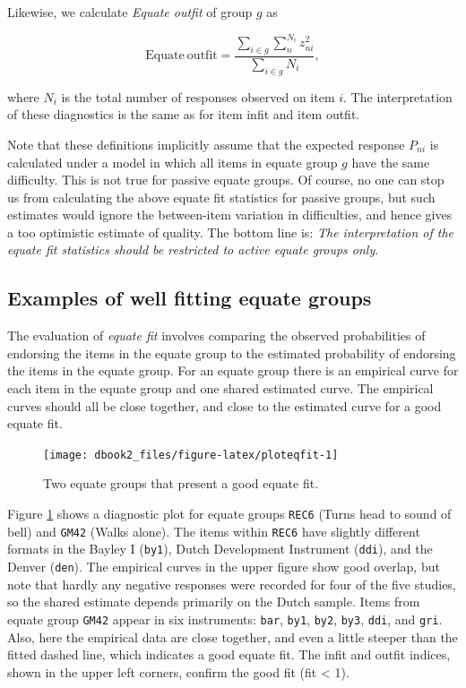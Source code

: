 \documentclass[
]{book}
\begin{document}
Likewise, we calculate \emph{Equate outfit} of group \(g\) as

\[\mathrm{Equate\ outfit} = \frac{\sum_{i\in g}\sum_{n}^{N_i} z_{ni}^2}{\sum_{i\in g} N_i},\]

where \(N_i\) is the total number of responses observed on item \(i\). The interpretation of these diagnostics is the same as for item infit and item outfit.

Note that these definitions implicitly assume that the expected response \(P_{ni}\) is calculated under a model in which all items in equate group \(g\) have the same difficulty. This is not true for passive equate groups. Of course, no one can stop us from calculating the above equate fit statistics for passive groups, but such estimates would ignore the between-item variation in difficulties, and hence gives a too optimistic estimate of quality. The bottom line is: \emph{The interpretation of the equate fit statistics should be restricted to active equate groups only}.

\hypertarget{examples-of-well-fitting-equate-groups}{%
\subsection{Examples of well fitting equate groups}\label{examples-of-well-fitting-equate-groups}}

The evaluation of \emph{equate fit} involves comparing the observed probabilities of endorsing the items in the equate group to the estimated probability of endorsing the items in the equate group. For an equate group there is an empirical curve for each item in the equate group and one shared estimated curve. The empirical curves should all be close together, and close to the estimated curve for a good equate fit.

\begin{figure}

{\centering \texttt{[image: dbook2\_files/figure-latex/ploteqfit-1]} 

}

\caption{Two equate groups that present a good equate fit.}\label{fig:ploteqfit}
\end{figure}



Figure \ref{fig:ploteqfit} shows a diagnostic plot for equate groups \texttt{REC6} (Turns head to sound of bell) and \texttt{GM42} (Walks alone). The items within \texttt{REC6} have slightly different formats in the Bayley I (\texttt{by1}), Dutch Development Instrument (\texttt{ddi}), and the Denver (\texttt{den}). The empirical curves in the upper figure show good overlap, but note that hardly any negative responses were recorded for four of the five studies, so the shared estimate depends primarily on the Dutch sample. Items from equate group \texttt{GM42} appear in six instruments: \texttt{bar}, \texttt{by1}, \texttt{by2}, \texttt{by3}, \texttt{ddi}, and \texttt{gri}. Also, here the empirical data are close together, and even a little steeper than the fitted dashed line, which indicates a good equate fit. The infit and outfit indices, shown in the upper left corners, confirm the good fit (fit \textless{} 1).
\end{document}
